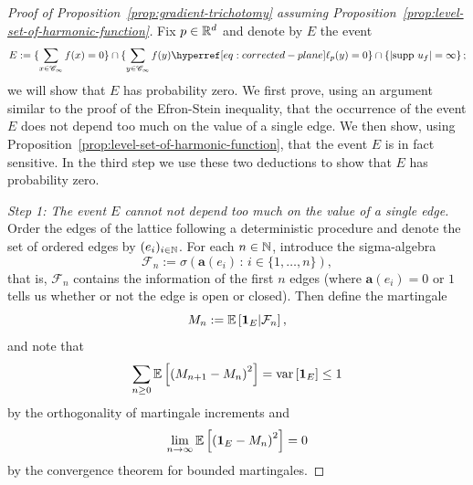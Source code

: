 \documentclass[12pt]{amsart}
\numberwithin{equation}{section}
\begin{document}
	\begin{proof}[Proof of Proposition~\ref{prop:gradient-trichotomy} assuming Proposition~\ref{prop:level-set-of-harmonic-function}]
		Fix $p \in \mathbb{R}^d$ and denote by $E$ the event
		\begin{equation*}
			E := \{ \sum_{x \in \mathscr{C}_\infty} f(x) = 0 \} \cap \{ \sum_{y \in \mathscr{C}_\infty} f(y) \ellp{p}(y)  = 0 \}  \cap \left\{ |\supp \, u_f| = \infty \right\};
		\end{equation*}
		we will show that $E$ has probability zero. We first prove, using an argument similar to the proof of the Efron-Stein inequality, that the occurrence of the event $E$ does not depend too much on the value of a single edge. We then show, using Proposition~\ref{prop:level-set-of-harmonic-function}, that the event $E$ is in fact sensitive. In the third step we use these two deductions to show that $E$ has probability zero.  
		
		\medskip 
		
		{\it Step 1: The event $E$ cannot not depend too much on the value of a single edge.} \\
		Order the edges of the lattice following a deterministic procedure and denote the set of ordered edges by $( e_i )_{i \in \operatorname{\mathbb{N}}} $. For each $n \in \operatorname{\mathbb{N}}$, introduce the sigma-algebra
		\begin{equation*}
			\mathcal{F}_n := \sigma \left( \mathbf{a}(e_i) \, : \, i \in \{ 1 , \ldots, n \} \right),
		\end{equation*}
		that is, $\mathcal{F}_n$ contains the information of the first $n$ edges (where $\mathbf{a}(e_i) = 0$ or $1$ tells us whether or not the edge is open or closed). Then define the martingale
		\begin{equation*}
			M_n := \operatorname{\mathop{\mathbb E{}}} \left[ {\boldsymbol{1}}_{E} | \mathcal{F}_n \right],
		\end{equation*}
		and note that
		\begin{equation} \label{eq:martingale-increment-converges}
			\sum_{n \geq 0} \operatorname{\mathop{\mathbb E{}}} \left[\left( M_{n+1} - M_n \right)^2\right] = \mathrm{var} \left[ {\boldsymbol{1}}_E \right] \leq 1
		\end{equation}
		by the orthogonality of martingale increments and
		\begin{equation} \label{eq:martingale-close-to-mean}
			\lim_{n \to \infty} \operatorname{\mathop{\mathbb E{}}} \left[ \left( {\boldsymbol{1}}_E -  M_n  \right)^2 \right] = 0
		\end{equation}
		by the convergence theorem for bounded martingales.
		

\end{proof}
\end{document}
